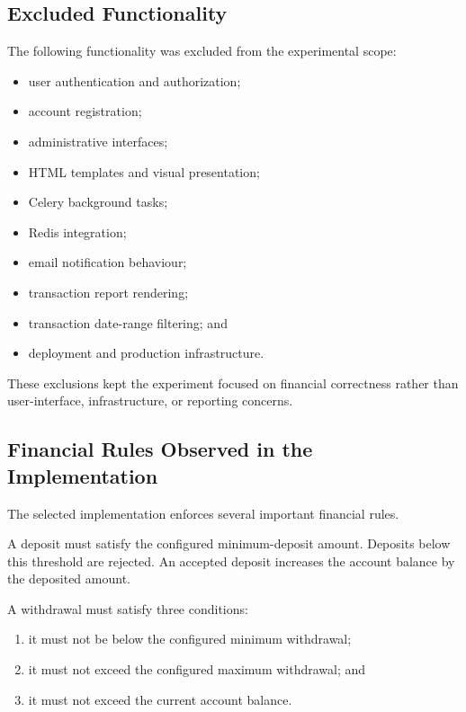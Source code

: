 \documentclass[12pt]{article}
\begin{document}
\subsection{Excluded Functionality}

The following functionality was excluded from the experimental scope:

\begin{itemize}
    \item user authentication and authorization;
    \item account registration;
    \item administrative interfaces;
    \item HTML templates and visual presentation;
    \item Celery background tasks;
    \item Redis integration;
    \item email notification behaviour;
    \item transaction report rendering;
    \item transaction date-range filtering; and
    \item deployment and production infrastructure.
\end{itemize}

These exclusions kept the experiment focused on financial correctness rather
than user-interface, infrastructure, or reporting concerns.

\subsection{Financial Rules Observed in the Implementation}

The selected implementation enforces several important financial rules.

A deposit must satisfy the configured minimum-deposit amount. Deposits below
this threshold are rejected. An accepted deposit increases the account balance
by the deposited amount.

A withdrawal must satisfy three conditions:

\begin{enumerate}
    \item it must not be below the configured minimum withdrawal;
    \item it must not exceed the configured maximum withdrawal; and
    \item it must not exceed the current account balance.
\end{enumerate}
\end{document}
